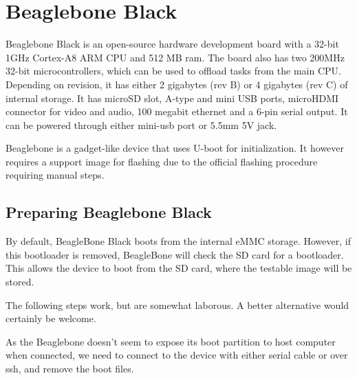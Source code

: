 \documentclass[a4paper,11pt]{article}
\begin{document}
\newpage
\section{Beaglebone Black}
Beaglebone Black is an open-source hardware development board with a 32-bit 1GHz Cortex-A8 ARM CPU and 512 MB ram. The board also has two 200MHz 32-bit microcontrollers, which can be used to offload tasks from the main CPU. Depending on revision, it has either 2 gigabytes (rev B) or 4 gigabytes (rev C) of internal storage. It has microSD slot, A-type and mini USB ports, microHDMI connector for video and audio, 100 megabit ethernet and a 6-pin serial output. It can be powered through either mini-usb port or 5.5mm 5V jack.

Beaglebone is a gadget-like device that uses U-boot for initialization. It however requires a support image for flashing due to the official flashing procedure requiring manual steps.

\subsection{Preparing Beaglebone Black}

By default, BeagleBone Black boots from the internal eMMC storage. However, if this bootloader is removed, BeagleBone will check the SD card for a bootloader. This allows the device to boot from the SD card, where the testable image will be stored.

The following steps work, but are somewhat laborous. A better alternative would certainly be welcome.

As the Beaglebone doesn't seem to expose its boot partition to host computer when connected, we need to connect to the device with either serial cable or over ssh, and remove the boot files.
\end{document}
